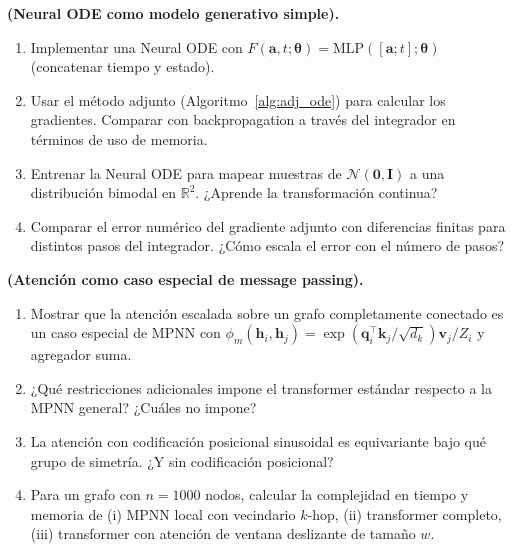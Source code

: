 \begin{ejercicio}
\textbf{(Neural ODE como modelo generativo simple).}
\begin{enumerate}[label=(\alph*)]
  \item Implementar una Neural ODE con $F(\bm{a},t;\bm{\theta}) =
        \mathrm{MLP}([\bm{a}; t];\bm{\theta})$ (concatenar tiempo y estado).
  \item Usar el método adjunto (Algoritmo~\ref{alg:adj_ode}) para calcular los
        gradientes. Comparar con backpropagation a través del integrador en
        términos de uso de memoria.
  \item Entrenar la Neural ODE para mapear muestras de $\mathcal{N}(\bm{0},\bm{I})$
        a una distribución bimodal en $\mathbb{R}^2$. ¿Aprende la transformación
        continua?
  \item Comparar el error numérico del gradiente adjunto con diferencias finitas
        para distintos pasos del integrador. ¿Cómo escala el error con el número
        de pasos?
\end{enumerate}
\end{ejercicio}

\begin{ejercicio}
\textbf{(Atención como caso especial de message passing).}
\begin{enumerate}[label=(\alph*)]
  \item Mostrar que la atención escalada sobre un grafo completamente conectado
        es un caso especial de MPNN con $\phi_m(\bm{h}_i,\bm{h}_j) =
        \exp(\bm{q}_i^\top\bm{k}_j/\sqrt{d_k})\bm{v}_j / Z_i$ y agregador suma.
  \item ¿Qué restricciones adicionales impone el transformer estándar respecto
        a la MPNN general? ¿Cuáles no impone?
  \item La atención con codificación posicional sinusoidal es equivariante bajo
        qué grupo de simetría. ¿Y sin codificación posicional?
  \item Para un grafo con $n = 1000$ nodos, calcular la complejidad en tiempo
        y memoria de (i) MPNN local con vecindario $k$-hop, (ii) transformer
        completo, (iii) transformer con atención de ventana deslizante de tamaño
        $w$.
\end{enumerate}
\end{ejercicio}


\printbibliography[heading=subbibliography]